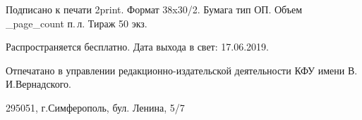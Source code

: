 \newpage
\thispagestyle{empty}

\tiny

\voffset=1.5cm

\vfill \null \vfill

\centerline{Подписано к печати \mbox{\sign2print}. Формат 38x30/2. Бумага тип ОП. Объем \print_page_count п.\,л. Тираж 50 экз.} 

\centerline{Распространяется бесплатно. Дата выхода в свет: 17.06.2019.}

\centerline{Отпечатано в управлении редакционно-издательской деятельности КФУ имени В.\,И.\;Вернадского.}

\centerline{295051, г.\;Симферополь, бул. Ленина, 5/7}

